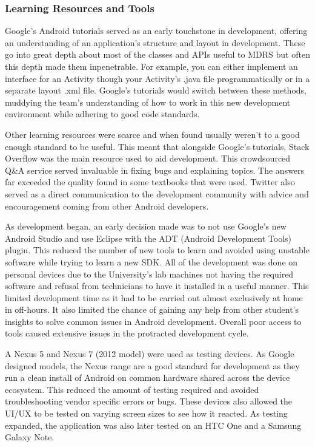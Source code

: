 \documentclass{l3proj}
\begin{document}
\subsubsection{Learning Resources and Tools} Google's Android tutorials served as an early touchstone in development, offering an understanding of an application's structure and layout in development. These go into great depth about most of the classes and APIs useful to MDRS but often this depth made them inpenetrable. For example, you can either implement an interface for an Activity though your Activity's .java file programmatically or in a separate layout .xml file. Google's tutorials would switch between these methods, muddying the team's understanding of how to work in this new development environment while adhering to good code standards.

Other learning resources were scarce and when found usually weren't to a good enough standard to be useful. This meant that alongside Google's tutorials\cite{googleandroidtutorials}, Stack Overflow\cite{stackOverflow} was the main resource used to aid development. This crowdsourced Q\&A service served invaluable in fixing bugs and explaining topics. The answers far exceeded the quality found in some textbooks that were used. Twitter also served as a direct communication to the development community with advice and encouragement coming from other Android developers.

As development began, an early decision made was to not use Google's new Android Studio and use Eclipse with the ADT (Android Development Tools) plugin. This reduced the number of new tools to learn and avoided using unstable software while trying to learn a new SDK. All of the development was done on personal devices due to the University's lab machines not having the required software and refusal from technicians to have it installed in a useful manner. This limited development time as it had to be carried out almost exclusively at home in off-hours. It also limited the chance of gaining any help from other student's insights to solve common issues in Android development. Overall poor access to tools caused extensive issues in the protracted  development cycle.

A Nexus 5 and Nexus 7 (2012 model) were used as testing devices. As Google designed models, the Nexus range are a good standard for development as they run a clean install of Android on common hardware shared across the device ecosystem. This reduced the amount of testing required and avoided troubleshooting vendor specific errors or bugs. These devices also allowed the UI/UX to be tested on varying screen sizes to see how it reacted. As testing expanded, the application was also later tested on an HTC One and a Samsung Galaxy Note.
\end{document}
